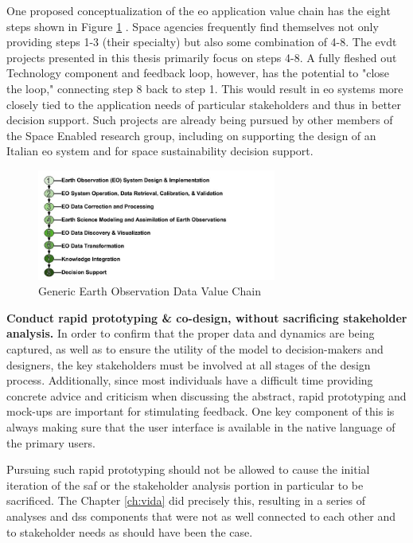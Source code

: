 One proposed conceptualization of the \ac{eo} application value chain has the eight steps shown in Figure \ref{fig:eochain}  \cite{hakimdavarTransboundaryWaterImproving2018, woodPartnershipsEnableEarth2017}. Space agencies frequently find themselves not only providing steps 1-3 (their specialty) but also some combination of 4-8. The \ac{evdt} projects presented in this thesis primarily focus on steps 4-8. A fully fleshed out Technology component and feedback loop, however, has the potential to "close the loop," connecting step 8 back to step 1. This would result in \ac{eo} systems more closely tied to the application needs of particular stakeholders and thus in better decision support. Such projects are already being pursued by other members of the Space Enabled research group, including on supporting the design of an Italian \ac{eo} system and for space sustainability decision support.

\begin{figure}[ht]
    \centering
    \includegraphics[width=0.7\textwidth]{Figures/chap7/EOChain.jpg}
    \caption{Generic Earth Observation Data Value Chain}
    \label{fig:eochain}
\end{figure}

\textbf{Conduct rapid prototyping \& co-design, without sacrificing stakeholder analysis.} In order to confirm that the proper data and dynamics are being captured, as well as to ensure the utility of the model to decision-makers and designers, the key stakeholders must be involved at all stages of the design process. Additionally, since most individuals have a difficult time providing concrete advice and criticism when discussing the abstract, rapid prototyping and mock-ups are important for stimulating feedback. One key component of this is always making sure that the user interface is available in the native language of the primary users.

Pursuing such rapid prototyping should not be allowed to cause the initial iteration of the \ac{saf} or the stakeholder analysis portion in particular to be sacrificed. The Chapter \ref{ch:vida} did precisely this, resulting in a series of analyses and \ac{dss} components that were not as well connected to each other and to stakeholder needs as should have been the case.

